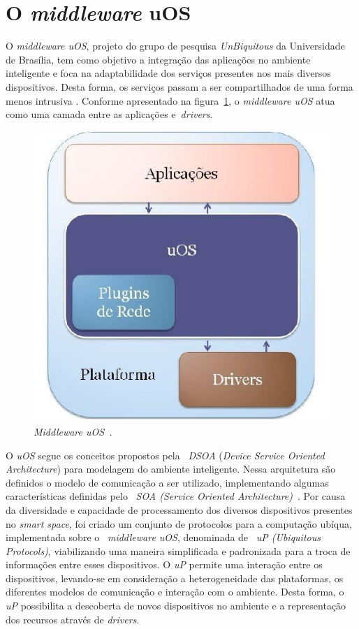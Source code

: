 \section{O \textit{middleware} uOS}
\label{sec:uos}
	 
	O \textit{middleware uOS}, projeto do grupo de pesquisa \textit{UnBiquitous} da Universidade de
	Brasília, tem como objetivo a integração das aplicações no ambiente inteligente e foca na
	adaptabilidade dos serviços presentes nos mais diversos dispositivos. Desta forma, os serviços
	passam a ser compartilhados de uma forma menos intrusiva \cite{buzeto}. Conforme apresentado na
	figura~\ref{fig:dsoa}, o \textit{middleware uOS} atua como uma camada entre as aplicações
	e~\textit{drivers}.
	
	\begin{figure}[htb]
		\centering \includegraphics[scale=.35]{figuras/cap2/dsoa.jpg}
		\caption{\textit{Middleware uOS~\cite{buzeto}.}}
		\label{fig:dsoa} 
	\end{figure}
	 
	O \textit{uOS} segue os conceitos propostos pela ~\textit{DSOA} (\textit{Device Service Oriented
	Architecture}) para modelagem do ambiente inteligente. Nessa arquitetura são definidos o modelo
	de comunicação a ser utilizado, implementando algumas características definidas pelo
	~\textit{SOA (Service Oriented Architecture)}~\cite{buzeto_11}. Por causa da diversidade e capacidade de
	processamento dos diversos dispositivos presentes no \textit{smart space}, foi criado um conjunto
	de protocolos para a computação ubíqua, implementada sobre o ~\textit{middleware uOS}, denominada de ~\textit{uP
 	(Ubiquitous Protocols)}, viabilizando uma maneira simplificada e padronizada para a troca de
 	informações entre esses dispositivos. O \textit{uP} permite uma interação entre os dispositivos,
 	levando-se em consideração a heterogeneidade das plataformas, os diferentes modelos de comunicação
 	e interação com o ambiente. Desta forma, o \textit{uP} possibilita a descoberta de novos
 	dispositivos no ambiente e a representação dos recursos através de \textit{drivers}.
	
